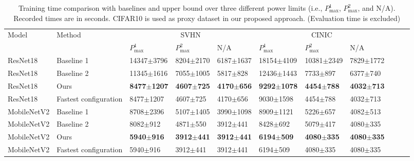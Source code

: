 


\begin{table*}[thb!]
  \caption{Training time comparison with baselines and upper bound over three different power limits (i.e., $P_\text{{max}}^{1}$, $P_{\text{max}}^{2}$, and N/A). Recorded times are in seconds. CIFAR10 is used as proxy dataset in our proposed approach. (Evaluation time is excluded)}
  \label{table:comparison_with_baseline_nano}
  \centering
  \begin{adjustbox}{width=\columnwidth,center}
  \begin{tabular}{lllllllllll}
    \toprule
    Model       & Method                & \multicolumn{3}{c}{SVHN}          & \multicolumn{3}{c}{CINIC} \\
    \cmidrule(r){3-5} \cmidrule(r){6-8}
                &                       & $P_\text{{max}}^{1}$ &$P_\text{{max}}^{2}$&N/A  &$P_{\text{max}}^{1}$&$P_{\text{max}}^{2}$& N/A \\
    \midrule
    ResNet18    & Baseline 1            &14347$\pm$3796  &8204$\pm$2170    &6187$\pm$1637   &18154$\pm$4109   &10381$\pm$2349 &7829$\pm$1772 \\
    ResNet18    & Baseline 2            &11345$\pm$1616 &7055$\pm$1005    &5817$\pm$\phantom{0}828   &12436$\pm$1443    &\phantom{0}7733$\pm$\phantom{0}897   &6377$\pm$\phantom{0}740 \\
    ResNet18    & Ours                  &\phantom{0}\textbf{8477$\pm$1207}  &\textbf{4607$\pm$\phantom{0}725}    &\textbf{4170$\pm$\phantom{0}656}    &\phantom{0}\textbf{9292$\pm$1078}    &\textbf{\phantom{0}4454$\pm$\phantom{0}788}   &\textbf{4032$\pm$713}  \\
    ResNet18    & Fastest configuration & \phantom{0}8477$\pm$1207  &4607$\pm$\phantom{0}725    &4170$\pm$\phantom{0}656  &\phantom{0}9030$\pm$1598   &\phantom{0}4454$\pm$\phantom{0}788   &4032$\pm$\phantom{0}713  \\
    \midrule
    
    MobileNetV2 & Baseline 1            &\phantom{0}8708$\pm$2396  &5107$\pm$1405     &3990$\pm$1098   &\phantom{0}8909$\pm$1121    &\phantom{0}5226$\pm$\phantom{0}657    &4082$\pm$\phantom{0}513  \\
    MobileNetV2 & Baseline 2            &\phantom{0}8082$\pm$\phantom{0}912  &4871$\pm$\phantom{0}550     &3912$\pm$\phantom{0}441   &\phantom{0}8428$\pm$\phantom{0}692     &\phantom{0}5079$\pm$\phantom{0}417    &4080$\pm$\phantom{0}335 \\
    MobileNetV2 & Ours                  &\phantom{0}\textbf{5940$\pm$\phantom{0}916}   &\textbf{3912$\pm$\phantom{0}441}     &\textbf{3912$\pm$\phantom{0}441}   &\phantom{0}\textbf{6194$\pm$\phantom{0}509}     &\textbf{\phantom{0}4080$\pm$\phantom{0}335}    &\textbf{4080$\pm$\phantom{0}335}  \\
    MobileNetV2 & Fastest configuration &\phantom{0}5940$\pm$\phantom{0}916   &3912$\pm$\phantom{0}441    &3912$\pm$\phantom{0}441   &\phantom{0}6194$\pm$\phantom{0}509     &\phantom{0}4080$\pm$\phantom{0}335    &4080$\pm$\phantom{0}335  \\
    \bottomrule
  \end{tabular}
  \end{adjustbox}
\end{table*}
